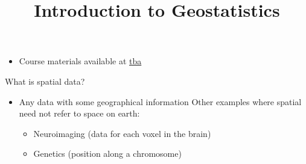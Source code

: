 



\title[]{Introduction to Geostatistics}




\maketitle

\begin{frame}[plain]
\begin{itemize}
\item Course materials available at \href{tba}{tba}
\end{itemize}
\end{frame}


\begin{frame}{What is spatial data?}
	\begin{itemize}
		\item Any data with some geographical information
			\pause{}
			\pause\myitem Other examples where spatial need not refer to space on earth:
			\begin{itemize}
				\item Neuroimaging (data for each voxel in the brain)
				\item Genetics (position along a chromosome)
			\end{itemize}
	\end{itemize}
\end{frame}

